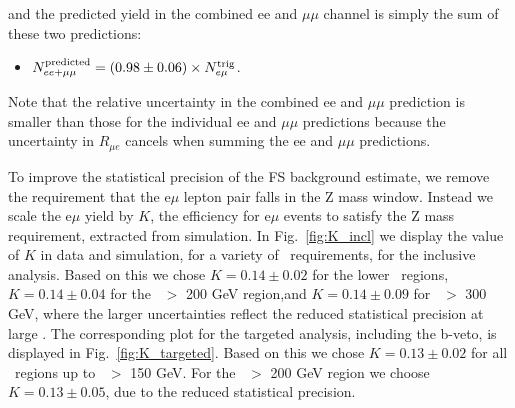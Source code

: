 and the predicted yield in the combined ee and $\mu\mu$ channel is simply the sum of these two predictions:

\begin{itemize}
\item $N_{ee+\mu\mu}^{\rm{predicted}} = (0.98\pm0.06)\times N_{e\mu}^{\rm{trig}}$.
\end{itemize}

Note that the relative uncertainty in the combined ee and $\mu\mu$ prediction is smaller than those for the individual ee and $\mu\mu$ predictions
because the uncertainty in $R_{\mu e}$ cancels when summing the ee and $\mu\mu$ predictions. %

To improve the statistical precision of the FS background estimate, we remove the requirement that the e$\mu$ lepton pair falls in the Z mass window.
Instead we scale the e$\mu$ yield by $K$, the efficiency for e$\mu$ events to satisfy the Z mass requirement, extracted from simulation. In Fig.~\ref{fig:K_incl}
we display the value of $K$ in data and simulation, for a variety of \MET\ requirements, for the inclusive analysis. 
Based on this we chose $K=0.14\pm0.02$ for the lower \MET\ regions, $K=0.14\pm0.04$ for the \MET\ $>$ 200 GeV region,and $K=0.14\pm0.09$ for \MET\ $>$ 300 GeV,
where the larger uncertainties reflect the reduced statistical precision at large \MET.
The corresponding plot for the targeted analysis, including the b-veto, is displayed in Fig.~\ref{fig:K_targeted}.
Based on this we chose $K=0.13\pm0.02$
for all \MET\ regions up to  \MET\ $>$ 150 GeV. For the \MET\ $>$ 200 GeV region we choose $K=0.13\pm0.05$, due to the reduced  statistical precision.


